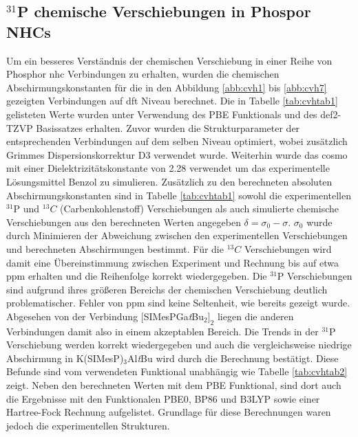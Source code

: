 \subsection{\texorpdfstring{$^{31}$P}{31P} chemische Verschiebungen in Phospor NHCs}
Um ein besseres Verständnis der chemischen Verschiebung in einer Reihe von Phosphor \ac{nhc} Verbindungen \supercite{lemp2017nhc} zu erhalten, wurden die chemischen Abschirmungskonstanten für die in den Abbildung \ref{abb:cvh1} bis \ref{abb:cvh7} gezeigten Verbindungen auf \ac{dft} Niveau berechnet. Die in Tabelle \ref{tab:cvhtab1} gelisteten Werte wurden unter Verwendung des PBE Funktionals\supercite{perdew1996generalized} und des def2-TZVP Basissatzes\supercite{weigend2005balanced} erhalten. Zuvor wurden die Strukturparameter der entsprechenden Verbindungen auf dem selben Niveau optimiert, wobei zusätzlich Grimmes Dispersionskorrektur D3\supercite{grimme2010consistent} verwendet wurde. Weiterhin wurde das \ac{cosmo}\supercite{klamt1993cosmo} mit einer Dielektrizitätskonstante von 2.28 verwendet um das experimentelle Lösungsmittel Benzol zu simulieren. Zusätzlich zu den berechneten absoluten Abschirmungskonstanten sind in Tabelle \ref{tab:cvhtab1} sowohl die experimentellen $^{31}$P und $^{13}C$ (Carbenkohlenstoff) Verschiebungen als auch simulierte chemische Verschiebungen aus den berechneten Werten angegeben $\delta=\sigma_0-\sigma$. $\sigma_0$ wurde durch Minimieren der Abweichung zwischen den experimentellen Verschiebungen und berechneten Abschirmungen bestimmt. Für die $^{13}C$ Verschiebungen wird damit eine Übereinstimmung zwischen Experiment und Rechnung bis auf etwa \unit[2]{ppm} erhalten und die Reihenfolge korrekt wiedergegeben. Die $^{31}$P Verschiebungen sind aufgrund ihres größeren Bereichs der chemischen Verschiebung deutlich problematischer. Fehler von \unit[30]{ppm} sind keine Seltenheit, wie bereits gezeigt wurde.\supercite{latypov2015quantum,reiter2017calculation} Abgesehen von der Verbindung $[$SIMesPGa\textit{t}Bu$_2]_2$ liegen die anderen Verbindungen damit also in einem akzeptablen Bereich. Die Trends in der $^{31}$P Verschiebung werden korrekt wiedergegeben und auch die vergleichsweise niedrige Abschirmung in K(SIMesP)$_3$Al\textit{t}Bu wird durch die Berechnung bestätigt. Diese Befunde sind vom verwendeten Funktional unabhängig wie Tabelle \ref{tab:cvhtab2} zeigt. Neben den berechneten Werten mit dem PBE Funktional, sind dort auch die Ergebnisse mit den Funktionalen PBE0\supercite{adamo1999toward}, BP86\supercite{perdew1986density,becke1988density} und B3LYP\supercite{lee1988development} sowie einer Hartree-Fock Rechnung aufgelistet. Grundlage für diese Berechnungen waren jedoch die experimentellen Strukturen.

